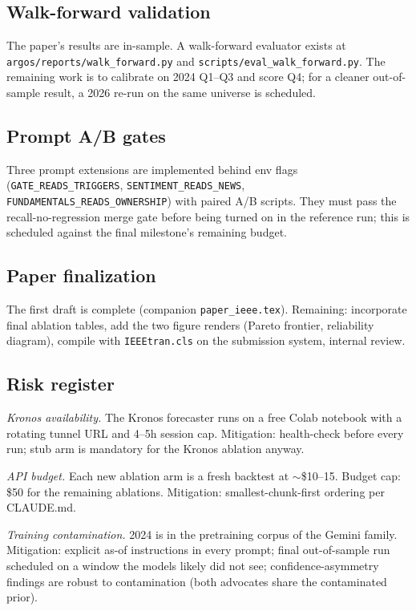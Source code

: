\documentclass[conference]{IEEEtran}
\begin{document}
\subsection{Walk-forward validation}
The paper's results are in-sample. A walk-forward evaluator exists
at \texttt{argos/reports/walk\_forward.py} and
\texttt{scripts/eval\_walk\_forward.py}. The remaining work is to
calibrate on 2024 Q1--Q3 and score Q4; for a cleaner out-of-sample
result, a 2026 re-run on the same universe is scheduled.

\subsection{Prompt A/B gates}
Three prompt extensions are implemented behind env flags
(\texttt{GATE\_READS\_TRIGGERS},
\texttt{SENTIMENT\_READS\_NEWS},
\texttt{FUNDAMENTALS\_READS\_OWNERSHIP}) with paired A/B scripts.
They must pass the recall-no-regression merge gate before being
turned on in the reference run; this is scheduled against the final
milestone's remaining budget.

\subsection{Paper finalization}
The first draft is complete (companion \texttt{paper\_ieee.tex}).
Remaining: incorporate final ablation tables, add the two figure
renders (Pareto frontier, reliability diagram), compile with
\texttt{IEEEtran.cls} on the submission system, internal review.

\subsection{Risk register}
\emph{Kronos availability.} The Kronos forecaster runs on a free
Colab notebook with a rotating tunnel URL and 4--5h session cap.
Mitigation: health-check before every run; stub arm is mandatory
for the Kronos ablation anyway.

\emph{API budget.} Each new ablation arm is a fresh backtest at
$\sim$\$10--15. Budget cap: \$50 for the remaining ablations.
Mitigation: smallest-chunk-first ordering per CLAUDE.md.

\emph{Training contamination.} 2024 is in the pretraining corpus of
the Gemini family. Mitigation: explicit as-of instructions in every
prompt; final out-of-sample run scheduled on a window the models
likely did not see; confidence-asymmetry findings are robust to
contamination (both advocates share the contaminated prior).
\end{document}
